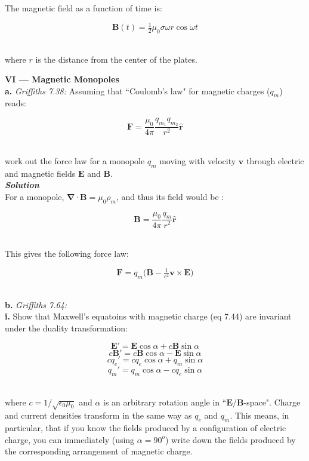 \documentclass[9pt]{extarticle}
\renewcommand{\v}[1]{{\bm #1}}
\newcommand{\hv}[1]{\hat{\bm{#1}}}
\newcommand{\bfit}[1]{\textbf{\textit{#1}}}
\renewcommand{\div}{\boldsymbol \nabla \cdot}
\newcommand{\eo}{\epsilon_0}
\newcommand{\muo}{\mu_0}
\begin{document}
\begin{multicols*}{2}
The magnetic field as a function of time is:

$$\v B(t) = \tfrac 12 \muo \sigma \omega r \cos\omega t$$ \ 

where $r$ is the distance from the center of the plates. \\ 







\hrulefill 

\hfill 

{\LARGE \bf VI --- Magnetic Monopoles} \\ 

{\Large \bf a.} {\it Griffiths 7.38:} Assuming that ``Coulomb's law" for magnetic charges ($q_m$) reads:

$$\v F = \frac{\muo}{4\pi} \frac{q_{m_1} q_{m_2}}{r^2} \hv r$$ \ 

work out the force law for a monopole $q_m$ moving with  velocity $\v v$ through electric and magnetic fields $\v E$ and $\v B$. \\ 

{\bfit{Solution}} \\ 

For a monopole, $\div \v B = \muo \rho_m$, and thus its field would be :

$$\v B = \frac{\muo}{4\pi} \frac{q_m}{r^2} \hv r$$ \ 

This gives the following force law:

$$\v F = q_m \big( \v B - \tfrac{1}{c^2} \v v \times \v E \big)$$ \ 





\dotfill 

\hfill 

{\Large \bf b.} {\it Griffiths 7.64:} \\ 

{\bf i.} Show that Maxwell's equatoins  with magnetic charge (eq 7.44) are invariant under the duality transformation:

$$\v E' = \v E\cos\alpha + c\v B\sin\alpha$$
$$c\v B' = c\v B\cos\alpha - \v E\sin\alpha$$
$$cq_e' = cq_e \cos\alpha + q_m\sin\alpha$$
$$q_m' = q_m\cos\alpha  -  cq_e\sin\alpha$$ \ 

where $c = 1/\sqrt{\eo\muo}$ and $\alpha$ is an arbitrary rotation angle in ``$\v E/\v B$-space". Charge and current densities transform in the same way as $q_e$ and $q_m$. This means, in particular, that if you know the fields produced by a configuration of electric charge, you can immediately (using $\alpha = 90^o$) write down the fields produced by the corresponding arrangement of magnetic charge. \\ 


\end{multicols*}
\end{document}
